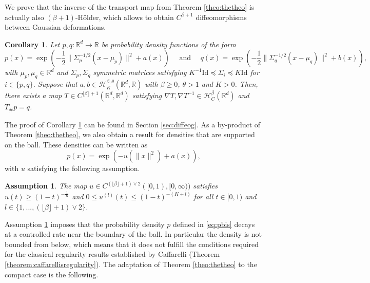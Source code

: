 \documentclass{article}
\newtheorem{corollary}{Corollary}
\newtheorem{assumption}{Assumption}
\begin{document}
We prove that the inverse of the transport map from Theorem \ref{theo:thetheo} is actually also $(\beta+1)$-Hölder, which allows to obtain $C^{\beta+1}$ diffeomorphisms between Gaussian deformations.

\begin{corollary}
\label{theo:diffeo}
Let $p,q:\mathbb{R}^d\rightarrow \mathbb{R}$ be probability density functions of the form $$p(x)=\exp\left(-\frac{1}{2}\|\Sigma_p^{-1/2}(x-\mu_p)\|^2+a(x)\right) \quad \text{ and } \quad q(x)=\exp\left(-\frac{1}{2}\|\Sigma_q^{-1/2}(x-\mu_q)\|^2+b(x)\right),$$
with $\mu_p,\mu_q\in \mathbb{R}^d$ and $\Sigma_p,\Sigma_q$ symmetric  matrices satisfying $K^{-1}\text{Id}\preceq \Sigma_i\preceq K\text{Id}$ for $i\in \{p,q\}$.
Suppose that $a,b \in \mathcal{H}^{\beta,\theta}_K(\mathbb{R}^d,\mathbb{R})$ with $\beta\geq 0$, $\theta>1$ and $K>0$. Then, there exists a map $T\in C^{\lfloor \beta \rfloor+1}(\mathbb{R}^d,\mathbb{R}^d)$ satisfying $\nabla T,\nabla T^{-1}\in  \mathcal{H}^{\beta}_C  (\mathbb{R}^d)$ and $T_{\# }p=q$. 
\end{corollary}

The proof of Corollary \ref{theo:diffeo} can be found in Section \ref{sec:diffeog}.  As a by-product of Theorem \ref{theo:thetheo}, we also obtain a result for densities that are supported on the ball. These densities can be written as 
\begin{equation}\label{eq:pbis}
p(x)=\exp\left(-u(\|x\|^2)+a(x)\right),
\end{equation}with $u$ satisfying the following assumption.
\begin{assumption}\label{assum:u}
    The map $u\in C^{(\lfloor \beta\rfloor +1)\vee 2}([0,1),[0,\infty))$ satisfies $u(t)\geq (1-t)^{-\frac{1}{K}}$ and $0\leq u^{(l)}(t)\leq (1-t)^{-(K+l)}$ for all $t\in [0,1)$ and $l\in \{1,...,(\lfloor \beta\rfloor +1)\vee 2\}$.
\end{assumption}
Assumption \ref{assum:u} imposes that the probability density $p$ defined in \eqref{eq:pbis} decays at a controlled rate near the boundary of the ball. In particular the density is not bounded from below, which means that it does not fulfill the conditions required for the classical regularity results established by Caffarelli (Theorem \ref{theorem:caffarellisregularity}). The adaptation of Theorem \ref{theo:thetheo} to the compact case is the following.
\end{document}
